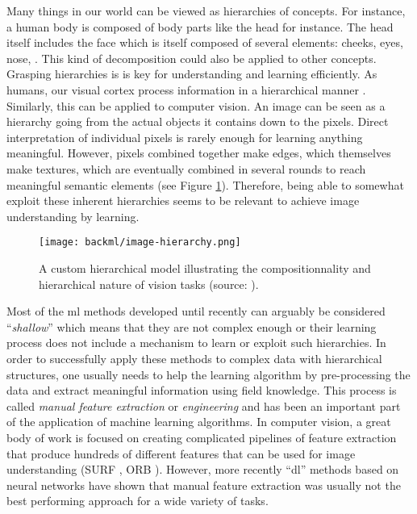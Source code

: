 Many things in our world can be viewed as hierarchies of concepts. For instance, a human body is composed of body parts like the head for instance. The head itself includes the face which is itself composed of several elements: cheeks, eyes, nose, \etc. This kind of decomposition could also be applied to other concepts. Grasping hierarchies is is key for understanding and learning efficiently. As humans, our visual cortex process information in a hierarchical manner \parencite{van1994neural}. Similarly, this can be applied to computer vision. An image can be seen as a hierarchy going from the actual objects it contains down to the pixels. Direct interpretation of individual pixels is rarely enough for learning anything meaningful. However, pixels combined together make edges, which themselves make textures, which are eventually combined in several rounds to reach meaningful semantic elements (see Figure \ref{fig:backml:hierarchy}). Therefore, being able to somewhat exploit these inherent hierarchies seems to be relevant to achieve image understanding by learning.

\begin{figure}
  \centering
  \texttt{[image: backml/image-hierarchy.png]}
  \caption{A custom hierarchical model illustrating the compositionnality and hierarchical nature of vision tasks (source: \parencite{leonardis2010learning}).}
  \label{fig:backml:hierarchy}
\end{figure}

Most of the \acrlong{ml} methods developed until recently can arguably be considered ``\textit{shallow}'' which means that they are not complex enough or their learning process does not include a mechanism to learn or exploit such hierarchies. In order to successfully apply these methods to complex data with hierarchical structures, one usually needs to help the learning algorithm by pre-processing the data and extract meaningful information using field knowledge. This process is called \textit{manual feature extraction} or \textit{engineering} and has been an important part of the application of machine learning algorithms. In computer vision, a great body of work is focused on creating complicated pipelines of feature extraction that produce hundreds of different features that can be used for image understanding (\eg SURF \parencite{bay2006surf}, ORB \parencite{rublee2011orb}). However, more recently ``\acrlong{dl}'' methods based on neural networks have shown that manual feature extraction was usually not the best performing approach for a wide variety of tasks.

